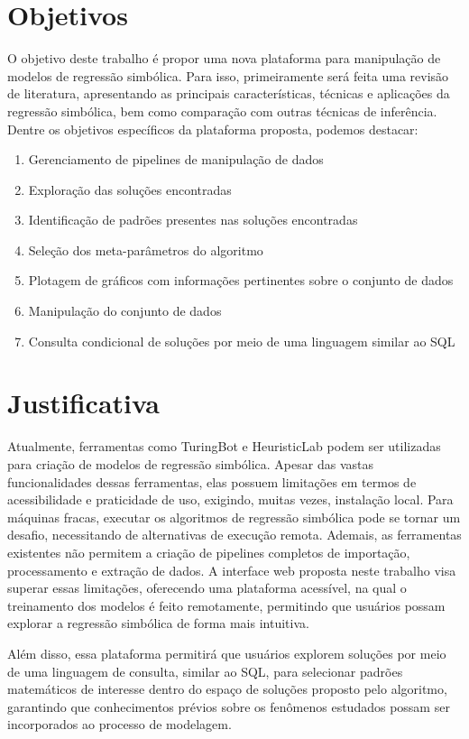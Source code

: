 \section{Objetivos}
O objetivo deste trabalho é propor uma nova plataforma para manipulação de modelos de regressão simbólica. Para isso, primeiramente será feita uma revisão de literatura, apresentando as principais características, técnicas e aplicações da regressão simbólica, bem como comparação com outras técnicas de inferência. Dentre os objetivos específicos da plataforma proposta, podemos destacar:
\begin{enumerate}
    \item Gerenciamento de pipelines de manipulação de dados
    \item Exploração das soluções encontradas
    \item Identificação de padrões presentes nas soluções encontradas
    \item Seleção dos meta-parâmetros do algoritmo
    \item Plotagem de gráficos com informações pertinentes sobre o conjunto de dados
    \item Manipulação do conjunto de dados
    \item Consulta condicional de soluções por meio de uma linguagem similar ao SQL
\end{enumerate}

\section{Justificativa}
Atualmente, ferramentas como TuringBot e HeuristicLab podem ser utilizadas para criação de modelos de regressão simbólica. Apesar das vastas funcionalidades dessas ferramentas, elas possuem limitações em termos de acessibilidade e praticidade de uso, exigindo, muitas vezes, instalação local. Para máquinas fracas, executar os algoritmos de regressão simbólica pode se tornar um desafio, necessitando de alternativas de execução remota. Ademais, as ferramentas existentes não permitem a criação de pipelines completos de importação, processamento e extração de dados. A interface web proposta neste trabalho visa superar essas limitações, oferecendo uma plataforma acessível, na qual o treinamento dos modelos é feito remotamente, permitindo que usuários possam explorar a regressão simbólica de forma mais intuitiva.

Além disso, essa plataforma permitirá que usuários explorem soluções por meio de uma linguagem de consulta, similar ao SQL, para selecionar padrões matemáticos de interesse dentro do espaço de soluções proposto pelo algoritmo, garantindo que conhecimentos prévios sobre os fenômenos estudados possam ser incorporados ao processo de modelagem.

